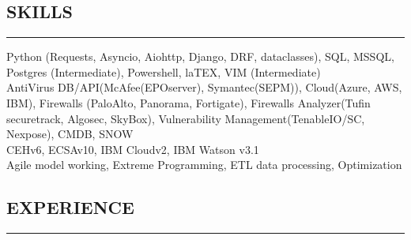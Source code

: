 \documentclass[10pt,a4]{article}
\begin{document}
\begin{small}
\subsection*{\color{dark_blue}SKILLS}
\vspace{-0.15cm}
\hrule
\vspace{0.1cm}
 Python {\color{gray}(Requests, Asyncio, Aiohttp, Django, DRF, dataclasses)}, SQL, MSSQL, Postgres {\color{gray}(Intermediate)}, Powershell, laTEX, VIM {\color{gray}(Intermediate)} \vspace{-0.25cm}\\

 AntiVirus DB/API{\color{gray}(McAfee(EPOserver), Symantec(SEPM))}, Cloud{\color{gray}(Azure, AWS, IBM)}, Firewalls {\color{gray}(PaloAlto, Panorama, Fortigate)}, Firewalls Analyzer{\color{gray}(Tufin securetrack, Algosec, SkyBox)},  Vulnerability Management{\color{gray}(TenableIO/SC, Nexpose)}, CMDB, SNOW  \vspace{-0.25cm}\\

 CEHv6, ECSAv10, IBM Cloudv2, IBM Watson v3.1  \vspace{-0.25cm}\\

{\noindent Agile model working, Extreme Programming, ETL data processing, Optimization}

\vspace{-0.35cm}
\subsection*{\color{dark_blue}EXPERIENCE}
\vspace{-0.15cm}
\hrule
\vspace{0.1cm}


\end{small}
\end{document}
